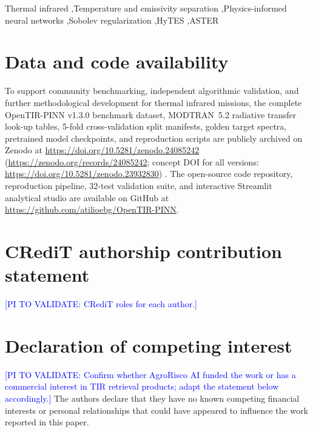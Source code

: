 \documentclass[preprint,review,12pt,authoryear]{elsarticle}
\newcommand{\pivalidate}[1]{\textcolor{blue}{[PI TO VALIDATE: #1]}}
\begin{document}
\begin{frontmatter}
\begin{keyword}
Thermal infrared \sep Temperature and emissivity separation \sep Physics-informed neural networks \sep Sobolev regularization \sep HyTES \sep ASTER
\end{keyword}

\end{frontmatter}










\section*{Data and code availability}
To support community benchmarking, independent algorithmic validation, and further methodological development for thermal infrared missions, the complete OpenTIR-PINN v1.3.0 benchmark dataset, MODTRAN~5.2 radiative transfer look-up tables, 5-fold cross-validation split manifests, golden target spectra, pretrained model checkpoints, and reproduction scripts are publicly archived on Zenodo at \url{https://doi.org/10.5281/zenodo.24085242} (\url{https://zenodo.org/records/24085242}; concept DOI for all versions: \url{https://doi.org/10.5281/zenodo.23932830}) \citep{grondona2026opentir}. The open-source code repository, reproduction pipeline, 32-test validation suite, and interactive Streamlit analytical studio are available on GitHub at \url{https://github.com/atilioebg/OpenTIR-PINN}.

\section*{CRediT authorship contribution statement}
\pivalidate{CRediT roles for each author.}

\section*{Declaration of competing interest}
\pivalidate{Confirm whether AgroRisco AI funded the work or has a commercial interest in TIR retrieval products; adapt the statement below accordingly.}
The authors declare that they have no known competing financial interests or personal relationships that could have appeared to influence the work reported in this paper.

\appendix






\end{document}
